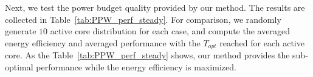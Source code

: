 Next, we test the power budget quality provided by our method. The results are collected in Table~\ref{tab:PPW_perf_steady}. For comparison, we randomly generate $10$ active core distribution for each case, and compute the averaged energy efficiency and averaged performance with the $T_{opt}$ reached for each active core. As the Table~\ref{tab:PPW_perf_steady} shows, our method provides the sub-optimal performance while the energy efficiency is maximized.









